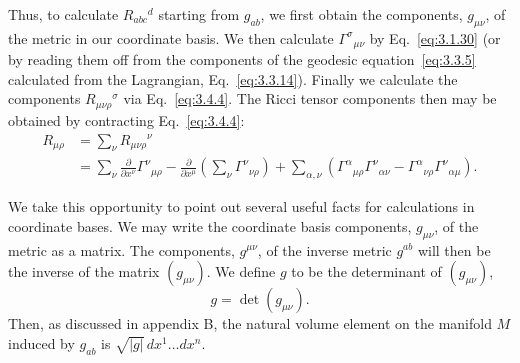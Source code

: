 Thus, to calculate $R_{abc}{}^d$ starting from $g_{ab}$, we first obtain the components, $g_{\mu\nu}$, of
the metric in our coordinate basis. We then calculate $\Gamma^\sigma{}_{\mu\nu}$ by Eq.~\eqref{eq:3.1.30} (or
by reading them off from the components of the geodesic equation~\eqref{eq:3.3.5} calculated
from the Lagrangian, Eq.~\eqref{eq:3.3.14}). Finally we calculate the components $R_{\mu\nu\rho}{}^\sigma$
via Eq.~\eqref{eq:3.4.4}. The Ricci tensor components then may be obtained by contracting Eq.~\eqref{eq:3.4.4}:
\begin{equation}
  \begin{aligned}
    R_{\mu\rho}
    &=\sum_\nu R_{\mu\nu\rho}{}^\nu\\
    &=\sum_\nu\frac{\partial}{\partial x^\nu}\Gamma^\nu{}_{\mu\rho}
    -\frac{\partial}{\partial x^\mu}\left(\sum_\nu\Gamma^\nu{}_{\nu\rho}\right)
    +\sum_{\alpha,\nu}\left(\Gamma^\alpha{}_{\mu\rho}\Gamma^\nu{}_{\alpha\nu}
    -\Gamma^\alpha{}_{\nu\rho}\Gamma^\nu{}_{\alpha\mu}\right).
  \end{aligned}
  \tag{3.4.5}\label{eq:3.4.5}
\end{equation}

We take this opportunity to point out several useful facts for calculations in
coordinate bases. We may write the coordinate basis components, $g_{\mu\nu}$, of the metric
as a matrix. The components, $g^{\mu\nu}$, of the inverse metric $g^{ab}$ will then be the inverse
of the matrix $(g_{\mu\nu})$. We define $g$ to be the determinant of $(g_{\mu\nu})$,
\begin{equation}
  g=\det(g_{\mu\nu}).
  \tag{3.4.6}\label{eq:3.4.6}
\end{equation}
Then, as discussed in appendix B, the natural volume element on the manifold $M$
induced by $g_{ab}$ is $\sqrt{|g|}\,dx^1\ldots dx^n$.

